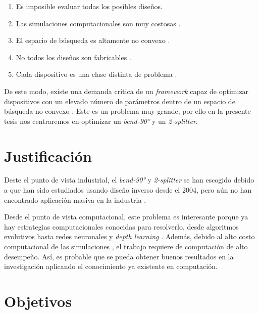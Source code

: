 \begin{enumerate}
  \item Es imposible evaluar todas los posibles diseños.
  \item Las simulaciones computacionales son muy costosas \citep{Kudyshev2020}.
  \item El espacio de búsqueda es altamente no convexo \citep{Su2018}.
  \item No todos los diseños son fabricables \citep{Su2020}.
  \item Cada dispositivo es una clase distinta de problema \citep{Molesky2018}.
\end{enumerate}


De este modo, existe una demanda crítica de un \emph{framework} capaz de optimizar dispositivos con un elevado número de parámetros dentro de un espacio de búsqueda no convexo \citep{Kudyshev2020}. Este es un problema muy grande, por ello en la presente tesis nos centraremos en optimizar un \emph{bend-90°} y un \emph{2-splitter}.

\section{Justificación}

Deste el punto de vista industrial, el \emph{bend-90°} y \emph{2-splitter} se han escogido debido a que han sido estudiados usando diseño inverso desde el 2004, pero aún no han encontrado aplicación masiva en la industria \citep{Molesky2018}. 

Desde el punto de vista computacional, este problema es interesante porque ya hay estrategias computacionales conocidas para resolverlo, desde algoritmos evolutivos \citep{Hansen2016} hasta redes neuronales \citep{Goodfellow2015} y \emph{depth learning} \citep{Malkiel2018}. 
Además, debido al alto costo computacional de las simulaciones \citep{Schneider2019}, el trabajo requiere de computación de alto desempeño.
Así, es probable que se pueda obtener buenos resultados en la investigación aplicando el conocimiento ya existente en computación.

\section{Objetivos}

